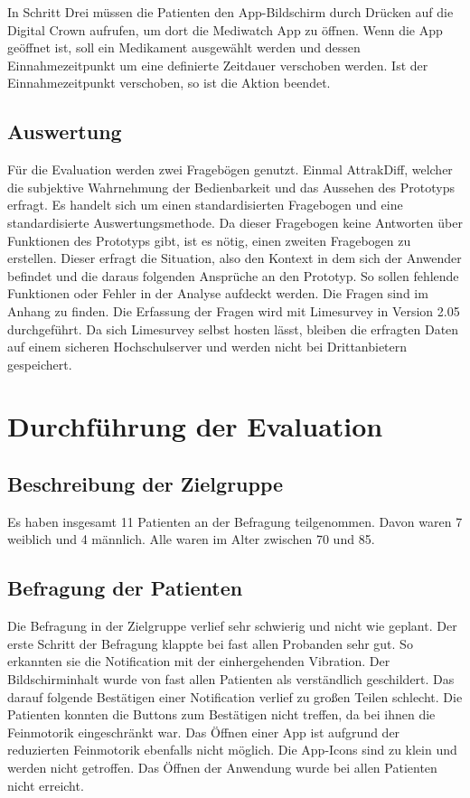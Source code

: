 In Schritt Drei müssen die Patienten den App-Bildschirm durch Drücken auf die Digital Crown aufrufen, um dort die Mediwatch App zu öffnen. Wenn die App geöffnet ist, soll ein Medikament ausgewählt werden und dessen Einnahmezeitpunkt um eine definierte Zeitdauer verschoben werden. Ist der Einnahmezeitpunkt verschoben, so ist die Aktion beendet.

\subsection{Auswertung}
Für die Evaluation werden zwei Fragebögen genutzt. Einmal AttrakDiff\cite{UserInDe:Attrakdiff}, welcher die subjektive  Wahrnehmung der Bedienbarkeit und das Aussehen des Prototyps erfragt. Es handelt sich um einen standardisierten Fragebogen und eine standardisierte Auswertungsmethode. Da dieser Fragebogen keine Antworten über Funktionen des Prototyps gibt, ist es nötig, einen zweiten Fragebogen zu erstellen. Dieser erfragt die Situation, also den Kontext in dem sich der Anwender befindet und die daraus folgenden Ansprüche an den Prototyp. So sollen fehlende Funktionen oder Fehler in der Analyse aufdeckt werden. Die Fragen sind im Anhang zu finden.
Die Erfassung der Fragen wird mit Limesurvey\cite{Limesurvey} in Version 2.05 durchgeführt. Da sich Limesurvey selbst hosten lässt, bleiben die erfragten Daten auf einem sicheren Hochschulserver und werden nicht bei Drittanbietern gespeichert. 

\section{Durchführung der Evaluation}
\subsection{Beschreibung der Zielgruppe}
Es haben insgesamt 11 Patienten  an der Befragung teilgenommen. Davon waren 7 weiblich und 4 männlich. Alle waren im Alter zwischen 70 und 85. 

\subsection{Befragung der Patienten}
Die Befragung in der Zielgruppe verlief sehr schwierig und nicht wie geplant.
Der erste Schritt der Befragung klappte bei fast allen Probanden sehr gut. So erkannten sie die Notification mit der einhergehenden Vibration. Der Bildschirminhalt wurde von fast allen Patienten als verständlich geschildert. Das darauf folgende Bestätigen einer Notification verlief zu großen Teilen schlecht. Die Patienten konnten die Buttons zum Bestätigen nicht treffen, da bei ihnen die Feinmotorik eingeschränkt war.
Das Öffnen einer App ist aufgrund der reduzierten Feinmotorik ebenfalls nicht möglich. Die App-Icons sind zu klein und werden nicht getroffen. Das Öffnen der Anwendung wurde bei allen Patienten nicht erreicht.
